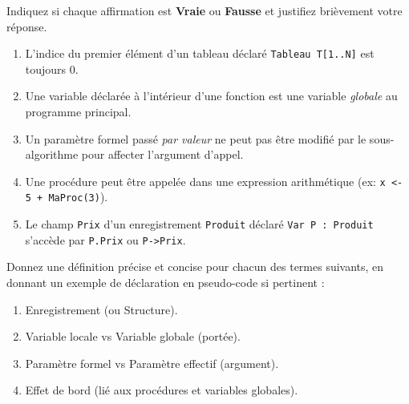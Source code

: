 \documentclass[11pt]{article}
\begin{document}
\begin{exercice}
Indiquez si chaque affirmation est \textbf{Vraie} ou \textbf{Fausse} et justifiez brièvement votre réponse.
\begin{enumerate}
    \item L'indice du premier élément d'un tableau déclaré \texttt{Tableau T[1..N]} est toujours 0.
    \item Une variable déclarée à l'intérieur d'une fonction est une variable \emph{globale} au programme principal.
    \item Un paramètre formel passé \emph{par valeur} ne peut pas être modifié par le sous-algorithme pour affecter l'argument d'appel.
    \item Une procédure peut être appelée dans une expression arithmétique (ex: \texttt{x <- 5 + MaProc(3)}).
    \item Le champ \texttt{Prix} d'un enregistrement \texttt{Produit} déclaré \texttt{Var P : Produit} s'accède par \texttt{P.Prix} ou \texttt{P->Prix}.
\end{enumerate}
\end{exercice}

\begin{exercice}
Donnez une définition précise et concise pour chacun des termes suivants, en donnant un exemple de déclaration en pseudo-code si pertinent :
\begin{enumerate}
    \item Enregistrement (ou Structure).
    \item Variable locale vs Variable globale (portée).
    \item Paramètre formel vs Paramètre effectif (argument).
    \item Effet de bord (lié aux procédures et variables globales).
\end{enumerate}
\end{exercice}
\end{document}
